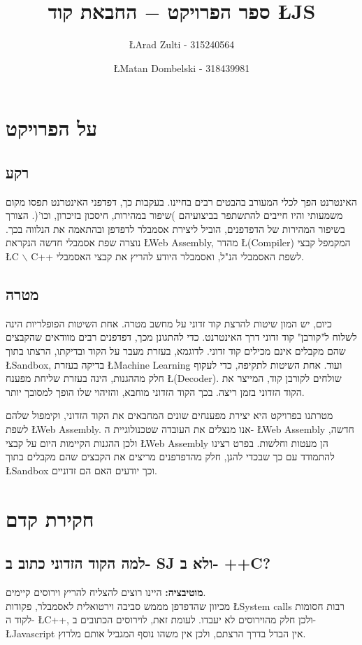 \documentclass{article}
\title{\vspace{-2.0cm}ספר הפרויקט $-$ החבאת קוד \L{JS}}
\author{\L{Arad Zulti - 315240564} \and \L{Matan Dombelski - 318439981}}
\begin{document}
 
	\onehalfspacing
	
	\maketitle
	\tableofcontents
	
	\section{על הפרויקט}
	\subsection{רקע}
		האינטרנט הפך לכלי המעורב בהבטים רבים בחיינו. 
		בעקבות כך, דפדפני האינטרנט תפסו מקום משמעותי והיו חייבים להתשתפר בביצועיהם )שיפור במהירות, חיסכון בזיכרון, וכו'(. 
		הצורך בשיפור המהירות של הדפדפנים, הוביל ליצירת אסמבלר לדפדפן ובהתאמה את הנלווה בכך. 
		נוצרה שפת אסמבלי חדשה הנקראת 
		\L{Web Assembly}, 
		מהדר 
		\L{(Compiler)} 
		המקמפל קבצי 
		\L{C $\backslash$ C++} 
		לשפת האסמבלי הנ"ל, ואסמבלר היודע להריץ את קבצי האסמבלי.
		
	\subsection{מטרה}
		כיום, יש המון שיטות להרצת קוד זדוני על מחשב מטרה. 
		אחת השיטות הפופלריות הינה לשלוח ל"קורבן" קוד זדוני דרך האינטרנט. 
		כדי להתגונן מכך, דפדפנים רבים מוודאים שהקבצים שהם מקבלים אינם  מכילים קוד זדוני. 
		לדוגמא, בעזרת מעבר על הקוד ובדיקתו, הרצתו בתוך 
		\L{Sandbox}, 
		בדיקה בעזרת 
		\L{Machine Learning} 
		ועוד. 
		אחת השיטות לתקיפה, כדי לעקוף חלק מההגנות, הינה בעזרת שליחת מפענח
		\L{(Decoder)}. 
		שולחים לקורבן קוד, המייצר את הקוד הזדוני בזמן ריצה.  
		בכך הקוד הזדוני מוחבא, והזיהוי שלו הופך למסובך יותר. 
		
		מטרתנו בפרויקט היא יצירת מפענחים שונים המחבאים את הקוד הזדוני, 
		וקימפול שלהם לשפת 
		\L{Web Assembly}. 
		אנו מנצלים את העובדה שטכנולוגיית ה- 
		\L{Web Assembly} 
		חדשה, ולכן ההגנות הקיימות היום על קבצי 
		\L{Web Assembly} 
		הן מעטות וחלשות. 
		בפרט רצינו להתמודד עם כך שבכדי להגן, 
		חלק מהדפדפנים מריצים את הקבצים שהם מקבלים בתוך 
		\L{Sandbox}
		וכך יודעים האם הם זדוניים. 

		\section{חקירת קדם}
		\subsection{למה הקוד הזדוני כתוב ב- SJ ולא ב- ++C?}
		\textbf{מוטיבציה:} 
		היינו רוצים להצליח להריץ וירוסים קיימים. \\
		מכיוון שהדפדפן מממש סביבה וירטואלית לאסמבלר, פקודות 
		\L{System calls} 
		רבות חסומות לקוד ה- 
		\L{C++}, 
		ולכן חלק מהוירוסים לא יעבדו. 
		לעומת זאת, לוירוסים הכתובים ב- 
		\L{Javascript} 
		אין הבדל בדרך הרצתם, ולכן אין משהו נוסף המגביל אותם מלרוץ. 		
\end{document}
